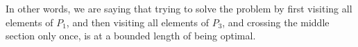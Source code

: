 



In other words, we are saying that trying to solve the problem by first visiting all elements of $P_1$, and then visiting all elements of $P_3$, and crossing the middle section only once, is at a bounded length of being optimal.

